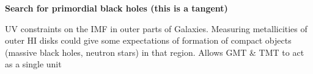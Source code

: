 \documentclass[11pt]{article}
\begin{document}
\textbf{Search for primordial black holes (this is a tangent)}

UV constraints on the IMF in outer parts of Galaxies. 
Measuring metallicities of outer HI disks could give some expectations of formation of compact objects (massive black holes, neutron stars) in that region. 
Allows GMT \& TMT to act as a single unit 

%


\telinstreq

%

\expdesign

%

\obssum
\end{document}
